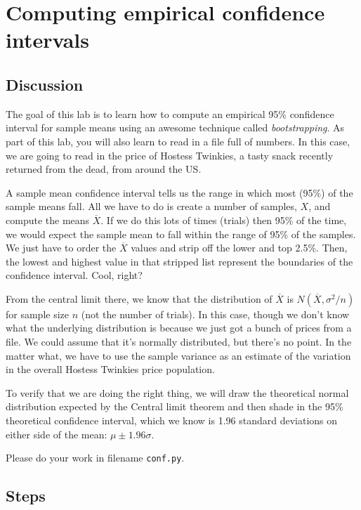 \chapter{Computing empirical confidence intervals}

\setcounter{problem}{1}
\section{Discussion}

\begin{fullwidth}


The goal of this lab is to learn how to compute an empirical 95\% confidence interval for sample means using an awesome technique called {\em bootstrapping}. As part of this lab, you will also learn to read in a file full of numbers. In this case, we are going to read in the price of Hostess Twinkies, a tasty snack recently returned from the dead, from around the US.

A sample mean confidence interval tells us the range in which most (95\%) of the sample means fall.  All we have to do is create a number of samples, $X$, and compute the means $\overline{X}$.  If we do this lots of times (trials) then 95\% of the time, we would expect the sample mean to fall within the range of 95\% of the samples. We just have to order the $\overline{X}$ values and strip off the lower and top 2.5\%. Then, the lowest and highest value in that stripped list represent the boundaries of the confidence interval. Cool, right?

From the central limit there, we know that the distribution of $\overline{X}$ is $N(\overline{X}, \sigma^2/n)$ for sample size $n$ (not the number of trials). In this case, though we don't know what the underlying distribution is because we just got a bunch of prices from a file. We could assume that it's normally distributed, but there's no point.  In the matter what, we have to use the sample variance as an estimate of the variation in the overall Hostess Twinkies price population.

To verify that we are doing the right thing, we will draw the theoretical normal distribution expected by the Central limit theorem and then shade in the 95\% theoretical confidence interval, which we know is 1.96 standard deviations on either side of the mean: $\mu \pm 1.96\sigma$.

Please do your work in filename {\tt conf.py}.

\section{Steps}


\end{fullwidth}
